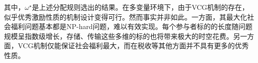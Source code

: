 \documentclass[promaster]{thesis-uestc}
\begin{document}
其中，$\omega^\star$是上述分配规则选出的结果。在多变量环境下，由于VCG机制的存在，似乎优秀激励性质的机制设计变得可行。然而事实并非如此。一方面，其最大化社会福利问题基本都是NP-hard问题，难以有效实现。每个参与者标的的长度随问题规模呈指数级增长，存储、传输这些多维的标的也将带来极大的时空花费。另一方面，VCG机制仅能保证社会福利最大，而在税收等其他方面并不具有更多的优秀性质。

%
%
%
%
%
\end{document}
